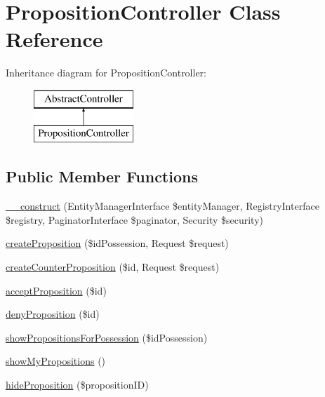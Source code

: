 \hypertarget{class_app_1_1_controller_1_1_proposition_controller}{}\section{Proposition\+Controller Class Reference}
\label{class_app_1_1_controller_1_1_proposition_controller}
Inheritance diagram for Proposition\+Controller\+:\begin{figure}[H]
\begin{center}
\leavevmode
\includegraphics[height=2.000000cm]{class_app_1_1_controller_1_1_proposition_controller}
\end{center}
\end{figure}
\subsection*{Public Member Functions}
\begin{DoxyCompactItemize}
\item 
\mbox{\hyperlink{class_app_1_1_controller_1_1_proposition_controller_ab68d2d9f0101f4e84cce0e646a7a554e}{\+\_\+\+\_\+construct}} (Entity\+Manager\+Interface \$entity\+Manager, Registry\+Interface \$registry, Paginator\+Interface \$paginator, Security \$security)
\item 
\mbox{\hyperlink{class_app_1_1_controller_1_1_proposition_controller_af7bd506007eaf156b8cf8e9c3a654ba3}{create\+Proposition}} (\$id\+Possession, Request \$request)
\item 
\mbox{\hyperlink{class_app_1_1_controller_1_1_proposition_controller_ab1f8753ff3e9da34db2cfbf14c9b64e4}{create\+Counter\+Proposition}} (\$id, Request \$request)
\item 
\mbox{\hyperlink{class_app_1_1_controller_1_1_proposition_controller_a3ba221ada65d0fdd55986bd759e280cd}{accept\+Proposition}} (\$id)
\item 
\mbox{\hyperlink{class_app_1_1_controller_1_1_proposition_controller_a3615f3f8ef2abe234776e9b537facef8}{deny\+Proposition}} (\$id)
\item 
\mbox{\hyperlink{class_app_1_1_controller_1_1_proposition_controller_a0181c8da3578351864cc96a333cdee91}{show\+Propositions\+For\+Possession}} (\$id\+Possession)
\item 
\mbox{\hyperlink{class_app_1_1_controller_1_1_proposition_controller_ad1b04fa5361ba787d3b028b744107151}{show\+My\+Propositions}} ()
\item 
\mbox{\hyperlink{class_app_1_1_controller_1_1_proposition_controller_a49e83473438777bf92eed253b93607ea}{hide\+Proposition}} (\$proposition\+ID)
\end{DoxyCompactItemize}


